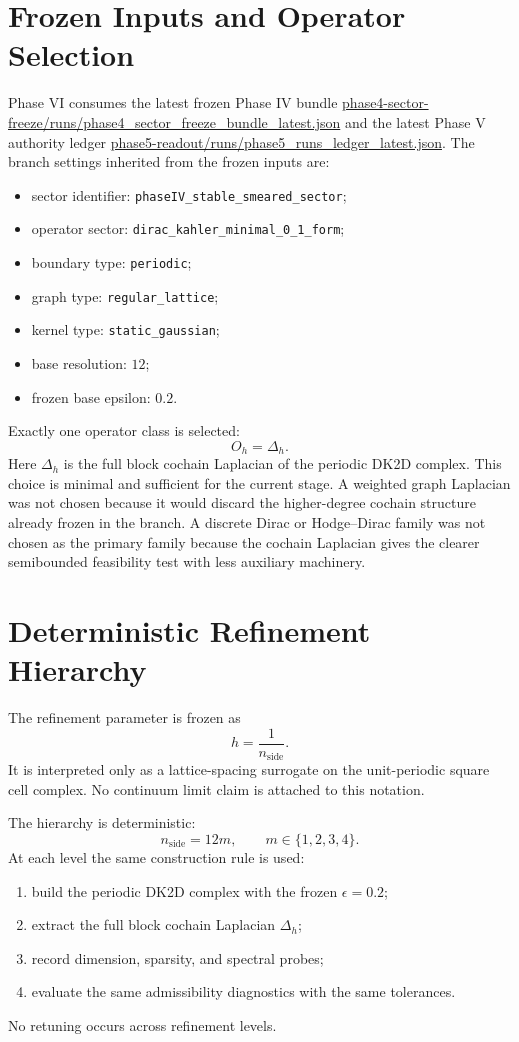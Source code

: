 \documentclass[11pt]{article}
\begin{document}
\section{Frozen Inputs and Operator Selection}

Phase VI consumes the latest frozen Phase IV bundle
\url{phase4-sector-freeze/runs/phase4_sector_freeze_bundle_latest.json}
and the latest Phase V authority ledger
\url{phase5-readout/runs/phase5_runs_ledger_latest.json}.
The branch settings inherited from the frozen inputs are:
\begin{itemize}
\item sector identifier: \texttt{phaseIV\_stable\_smeared\_sector};
\item operator sector: \texttt{dirac\_kahler\_minimal\_0\_1\_form};
\item boundary type: \texttt{periodic};
\item graph type: \texttt{regular\_lattice};
\item kernel type: \texttt{static\_gaussian};
\item base resolution: $12$;
\item frozen base epsilon: $0.2$.
\end{itemize}

Exactly one operator class is selected:
\[
O_h = \Delta_h .
\]
Here $\Delta_h$ is the full block cochain Laplacian of the periodic DK2D complex. This choice is minimal and sufficient for the current stage. A weighted graph Laplacian was not chosen because it would discard the higher-degree cochain structure already frozen in the branch. A discrete Dirac or Hodge--Dirac family was not chosen as the primary family because the cochain Laplacian gives the clearer semibounded feasibility test with less auxiliary machinery.

\section{Deterministic Refinement Hierarchy}

The refinement parameter is frozen as
\[
h = \frac{1}{n_{\mathrm{side}}}.
\]
It is interpreted only as a lattice-spacing surrogate on the unit-periodic square cell complex. No continuum limit claim is attached to this notation.

The hierarchy is deterministic:
\[
n_{\mathrm{side}} = 12m, \qquad m \in \{1,2,3,4\}.
\]
At each level the same construction rule is used:
\begin{enumerate}
\item build the periodic DK2D complex with the frozen $\epsilon = 0.2$;
\item extract the full block cochain Laplacian $\Delta_h$;
\item record dimension, sparsity, and spectral probes;
\item evaluate the same admissibility diagnostics with the same tolerances.
\end{enumerate}
No retuning occurs across refinement levels.
\end{document}
